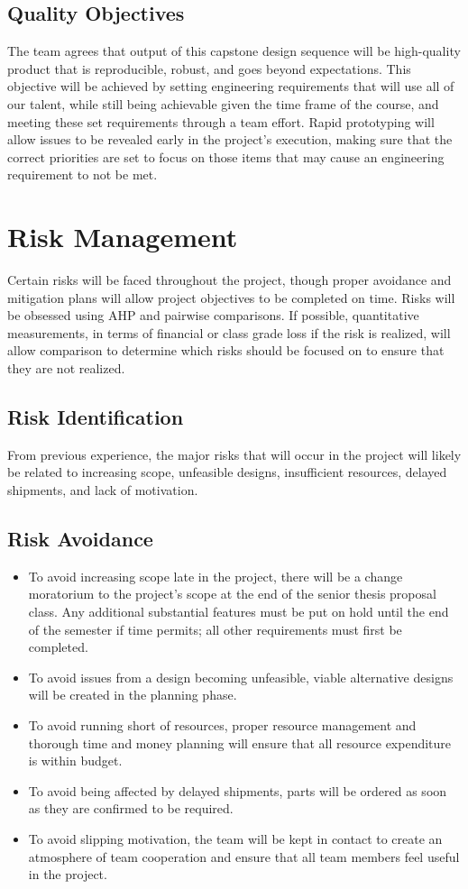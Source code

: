 \subsection{Quality Objectives}
The team agrees that output of this capstone design sequence will be high-quality product that is reproducible, robust, and goes beyond expectations.
This objective will be achieved by setting engineering requirements that will use all of our talent, while still being achievable given the time frame of the course, and meeting these set requirements through a team effort.
Rapid prototyping will allow issues to be revealed early in the project's execution, making sure that the correct priorities are set to focus on those items that may cause an engineering requirement to not be met.

\section{Risk Management}
Certain risks will be faced throughout the project, though proper avoidance and mitigation plans will allow project objectives to be completed on time.
Risks will be obsessed using AHP and pairwise comparisons.
If possible, quantitative measurements, in terms of financial or class grade loss if the risk is realized, will allow comparison to determine which risks should be focused on to ensure that they are not realized.

\subsection{Risk Identification}
From previous experience, the major risks that will occur in the project will likely be related to increasing scope, unfeasible designs, insufficient resources, delayed shipments, and lack of motivation.

\subsection{Risk Avoidance}
\begin{itemize} \parskip2pt
	\item To avoid increasing scope late in the project, there will be a change moratorium to the project’s scope at the end of the senior thesis proposal class. Any additional substantial features must be put on hold until the end of the semester if time permits; all other requirements must first be completed.
	\item To avoid issues from a design becoming unfeasible, viable alternative designs will be created in the planning phase.
	\item To avoid running short of resources, proper resource management and thorough time and money planning will ensure that all resource expenditure is within budget.
	\item To avoid being affected by delayed shipments, parts will be ordered as soon as they are confirmed to be required.
	\item To avoid slipping motivation, the team will be kept in contact to create an atmosphere of team cooperation and ensure that all team members feel useful in the project.
\end{itemize}	

